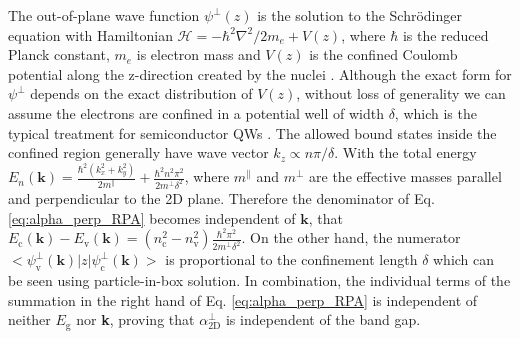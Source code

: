 \documentclass[manuscript=suppinfo,email=true,hyperref=true,keywords=false]{achemso}
\begin{document}
The out-of-plane wave function $\psi^{\perp}(z)$ is the solution to the Schr\"{o}dinger equation with
Hamiltonian $\mathcal{H} = -\hbar^{2} \nabla^{2}/2m_{e} + V(z)$, where
$\hbar$ is the reduced Planck constant, $m_{e}$ is electron mass and
$V(z)$ is the confined Coulomb potential along the z-direction
created by the nuclei
\cite{davies_physics_1997,ihn_semiconductor_2009}. Although the exact
form for $\psi^{\perp}$ depends on the exact distribution of $V(z)$,
without loss of generality we can assume the electrons are confined in
a potential well of width $\delta$, which is the typical treatment for
semiconductor QWs \cite{ihn_semiconductor_2009}. The allowed bound
states inside the confined region generally have wave vector
$k_{z} \propto n \pi / \delta$. With the total energy
$E_{n}(\mathbf{k}) = {\displaystyle \frac{\hbar^{2} (k_{x}^{2} +
    k_{y}^{2})}{2 m^{\parallel}} + \frac{\hbar^{2} n^{2} \pi^{2}}{2
    m^{\perp} \delta^{2}}}$, where $m^{\parallel}$ and $m^{\perp}$ are
the effective masses parallel and perpendicular to the 2D
plane. Therefore the denominator of Eq. \ref{eq:alpha_perp_RPA} becomes independent of
$\mathbf{k}$, that
$E_{\mathrm{c}}(\mathbf{k}) - E_{\mathrm{v}}(\mathbf{k}) =
(n_{\mathrm{c}}^{2} - n_{\mathrm{v}}^{2}) {\displaystyle
  \frac{\hbar^{2} \pi^{2}}{2 m^{\perp} \delta^{2}}}$. On the other
hand, the numerator
$<\psi^{\perp}_{\mathrm{v}}(\mathbf{k})|z|\psi^{\perp}_{\mathrm{c}}(\mathbf{k})>$
is proportional to the confinement length $\delta$ which can be seen using
particle-in-box solution\cite{davies_physics_1997}. In combination,
the individual terms of the summation in the right hand of Eq. \ref{eq:alpha_perp_RPA} is
independent of neither $E_{\mathrm{g}}$ nor \textbf{k}, proving that
$\alpha_{\mathrm{2D}}^{\perp}$ is independent of the band gap.
\end{document}
